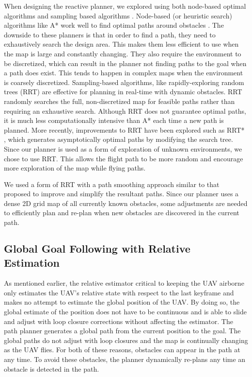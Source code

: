\documentclass[letterpaper, 10 pt, conference]{ieeeconf}  %
\begin{document}
When designing the reactive planner, we explored using both node-based optimal algorithms and sampling based algorithms \cite{Yang2016}. Node-based (or heuristic search) algorithms like A* work well to find optimal paths around obstacles \cite{Nilsson2011}. The downside to these planners is that in order to find a path, they need to exhaustively search the design area. This makes them less efficient to use when the map is large and constantly changing. They also require the environment to be discretized, which can result in the planner not finding paths to the goal when a path does exist. This tends to happen in complex maps when the environment is coarsely discretized. Sampling-based algorithms, like rapidly-exploring random trees (RRT) \cite{Lavalle1998} are effective for planning in real-time with dynamic obstacles. RRT randomly searches the full, non-discretized map for feasible paths rather than requiring an exhaustive search. Although RRT does not guarantee optimal paths, it is much less computationally intensive than A* each time a new path is planned. More recently, improvements to RRT have been explored such as RRT* \cite{Karaman2011}, which generates asymptotically optimal paths by modifying the search tree. Since our planner is used as a form of exploration of unknown environments, we chose to use RRT. This allows the flight path to be more random and encourage more exploration of the map while flying paths.

We used a form of RRT with a path smoothing approach similar to that proposed \cite{Beard} to improve and simplify the resultant paths. Since our planner uses a dense 2D grid map of all currently known obstacles, some adjustments are needed to efficiently plan and re-plan when new obstacles are discovered in the current path.

\subsection{Global Goal Following with Relative Estimation}

As mentioned earlier, the relative estimator critical to keeping the UAV airborne only estimates the UAV's relative state with respect to the last keyframe and makes no attempt to estimate the global position of the UAV. By doing so, the global estimate of the position does not have to be continuous and is able to slide and adjust with loop closure corrections without affecting the estimator. The path planner generates a global path from the current position to the goal. The global paths do not adjust with loop closures and the map is continually changing as the UAV flies. For both of these reasons, obstacles can appear in the path at any time. To avoid these obstacles, the planner dynamically re-plans any time an obstacle is detected in the path.
\end{document}
